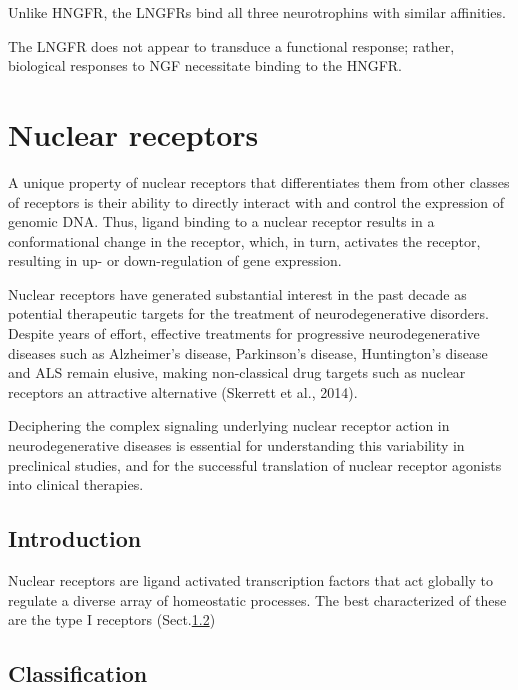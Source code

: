 Unlike HNGFR, the LNGFRs bind all three neurotrophins with similar affinities.

The LNGFR does not appear to transduce a functional response; rather, biological
responses to NGF necessitate binding to the HNGFR.

\chapter{Nuclear receptors}
\label{chap:nuclear-receptors}

A unique property of nuclear receptors that differentiates them from other
classes of receptors is their ability to directly interact with and control the
expression of genomic DNA.
Thus, ligand binding to a nuclear receptor results in a conformational change in
the receptor, which, in turn, activates the receptor, resulting in up- or
down-regulation of gene expression.


Nuclear receptors have generated substantial interest in the past decade as
potential therapeutic targets for the treatment of neurodegenerative disorders.
Despite years of effort, effective treatments for progressive neurodegenerative
diseases such as Alzheimer's disease, Parkinson's disease, Huntington's disease
and ALS remain elusive, making non-classical drug targets such as nuclear
receptors an attractive alternative (Skerrett et al., 2014).

Deciphering the complex signaling underlying nuclear receptor action in
neurodegenerative diseases is essential for understanding this variability in
preclinical studies, and for the successful translation of nuclear receptor
agonists into clinical therapies.   

\section{Introduction}
\label{sec:nuclear-receptors}

Nuclear receptors are ligand activated transcription factors that act globally
to regulate a diverse array of homeostatic processes.
The best characterized of these are the type I receptors
(Sect.\ref{sec:nuclear-receptor-classification})



\section{Classification}
\label{sec:nuclear-receptor-classification}

